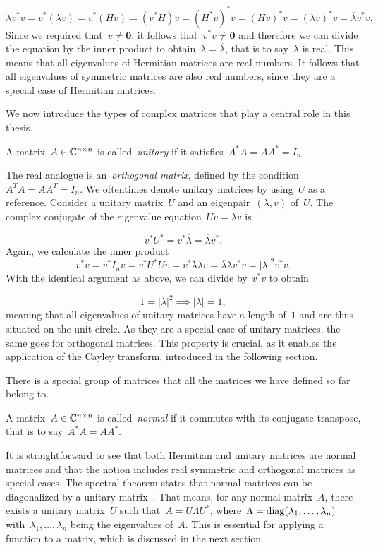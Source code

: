 \[
    \lambda v^* v = v^* \left( \lambda v \right)
    = v^* \left( H v \right)
    = \left(v^* H \right) v
    = \left( H^* v \right)^* v
    = \left( H v \right)^* v
    = (\lambda v)^* v
    = \overline{\lambda} v^* v.
\]
Since we required that~$v \neq \mathbf{0}$, it follows that~$v^* v \neq \mathbf{0}$ and therefore we can divide the equation by the inner product to obtain~$\lambda = \overline{\lambda}$, that is to say~$\lambda$ is real. This means that all eigenvalues of Hermitian matrices are real numbers. It follows that all eigenvalues of symmetric matrices are also real numbers, since they are a special case of Hermitian matrices.

We now introduce the types of complex matrices that play a central role in this thesis.

\begin{definition}
    A matrix~$A \in \mathbb{C}^{n \times n}$ is called~\emph{unitary} if it satisfies~$A^* A = A A^* = I_n$.
\end{definition}
\noindent
The real analogue is an~\emph{orthogonal matrix}, defined by the condition~$A^T A = A A^T = I_n$. We oftentimes denote unitary matrices by using~$U$ as a reference. Consider a unitary matrix~$U$ and an eigenpair~$(\lambda, v)$ of~$U$. The complex conjugate of the eigenvalue equation~$U v = \lambda v$ is

\[
    v^* U^* = v^* \overline{\lambda} = \overline{\lambda} v^*.
\]
Again, we calculate the inner product
\[
    v^* v = v^* I_n v = v^* U^* U v = v^* \overline{\lambda} \lambda v = \overline{\lambda} \lambda v^* v = \left| \lambda \right|^2 v^* v.
\]
With the identical argument as above, we can divide by~$v^* v$ to obtain

\[
    1 = \left| \lambda \right|^2 \implies \left| \lambda \right| = 1,
\]
meaning that all eigenvalues of unitary matrices have a length of~$1$ and are thus situated on the unit circle. As they are a special case of unitary matrices, the same goes for orthogonal matrices. This property is crucial, as it enables the application of the Cayley transform, introduced in the following section.

There is a special group of matrices that all the matrices we have defined so far belong to.

\begin{definition}
    A matrix~$A \in \mathbb{C}^{n \times n}$ is called~\emph{normal} if it commutes with its conjugate transpose,
    that is to say~$A^* A = A A^*$.
\end{definition}
\noindent
It is straightforward to see that both Hermitian and unitary matrices are normal matrices and that the notion includes real symmetric and orthogonal matrices as special cases. The spectral theorem states that normal matrices can be diagonalized by a unitary matrix~\cite[Thm.~7.24, p.~218]{sheldonaxler}. That means, for any normal matrix~$A$, there exists a unitary matrix~$U$ such that~$A = U \Lambda U^*$, where~$\Lambda = \operatorname{diag}(\lambda_1, \ldots, \lambda_n)$ with~$\lambda_1, \ldots, \lambda_n$ being the eigenvalues of~$A$. This is essential for applying a function to a matrix, which is discussed in the next section.

